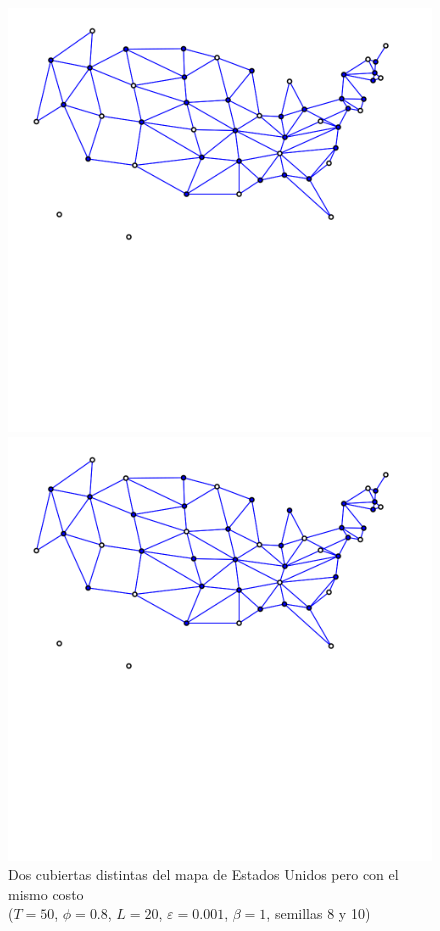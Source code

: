 \documentclass{article}
\begin{document}
  \begin{figure}[H]
    \centering
    \begin{minipage}{.5\textwidth}
      \centering
      \includegraphics[scale=0.35]{usa}
    \end{minipage}%
    \begin{minipage}{.5\textwidth}
      \centering
      \includegraphics[scale=0.35]{usa2}
    \end{minipage}
    \caption{Dos cubiertas distintas del mapa de Estados Unidos pero con el mismo 
      costo\\
      ($T=50$, $\phi=0.8$, $L=20$, $\varepsilon = 0.001$, $\beta=1$, semillas 8 y 10)}
  \end{figure}
\end{document}
